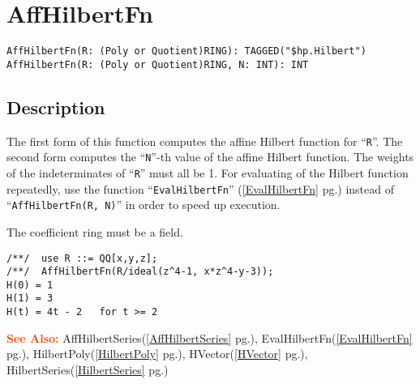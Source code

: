 \documentclass[a4paper]{mybook}
\newenvironment{command}{}{} %
\newcommand\SeeAlso{\par\textcolor{OrangeRed}{\textbf{\large See Also: }}}
\begin{document}
\section{AffHilbertFn}
\label{AffHilbertFn}
\begin{command} %


\begin{Verbatim}[label=syntax, rulecolor=\color{MidnightBlue},
frame=single]
AffHilbertFn(R: (Poly or Quotient)RING): TAGGED("$hp.Hilbert")
AffHilbertFn(R: (Poly or Quotient)RING, N: INT): INT
\end{Verbatim}


\subsection*{Description}

The first form of this function computes the affine Hilbert function
for ``\verb&R&''.  The second form computes the ``\verb&N&''-th value of the affine
Hilbert function.  The weights of the indeterminates of ``\verb&R&'' must all
be 1.  For evaluating of the Hilbert function repeatedly, use the
function ``\verb&EvalHilbertFn&'' (\ref{EvalHilbertFn} pg.\pageref{EvalHilbertFn}) instead of ``\verb&AffHilbertFn(R, N)&'' in order
to speed up execution.
\par 
The coefficient ring must be a field.
\begin{Verbatim}[label=example, rulecolor=\color{PineGreen}, frame=single]
/**/  use R ::= QQ[x,y,z];
/**/  AffHilbertFn(R/ideal(z^4-1, x*z^4-y-3));
H(0) = 1
H(1) = 3
H(t) = 4t - 2   for t >= 2
\end{Verbatim}


\SeeAlso %
  AffHilbertSeries(\ref{AffHilbertSeries} pg.\pageref{AffHilbertSeries}), 
    EvalHilbertFn(\ref{EvalHilbertFn} pg.\pageref{EvalHilbertFn}), 
    HilbertPoly(\ref{HilbertPoly} pg.\pageref{HilbertPoly}), 
    HVector(\ref{HVector} pg.\pageref{HVector}), 
    HilbertSeries(\ref{HilbertSeries} pg.\pageref{HilbertSeries})
\end{command} %
\end{document}
